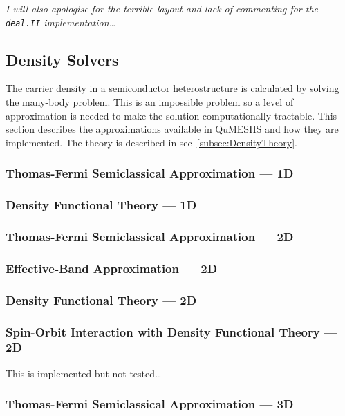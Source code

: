 \documentclass[12pt]{article}
\newcommand{\red}[1]{{\color{red} \it #1}}
\begin{document}
\red{I will also apologise for the terrible layout and lack of commenting for the
\texttt{deal.II} implementation\ldots}


\subsection{Density Solvers}

The carrier density in a semiconductor heterostructure is calculated by solving
the many-body problem.  This is an impossible problem so a level of approximation
is needed to make the solution computationally tractable.  This section describes
the approximations available in QuMESHS and how they are implemented.  The theory
is described in sec~\ref{subsec:DensityTheory}.

\subsubsection{Thomas-Fermi Semiclassical Approximation --- 1D}



\subsubsection{Density Functional Theory --- 1D}

\subsubsection{Thomas-Fermi Semiclassical Approximation --- 2D}

\subsubsection{Effective-Band Approximation --- 2D}

\subsubsection{Density Functional Theory --- 2D}

\subsubsection{Spin-Orbit Interaction with Density Functional Theory --- 2D}

This is implemented but not tested\ldots

\subsubsection{Thomas-Fermi Semiclassical Approximation --- 3D}
\end{document}
